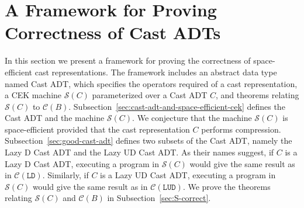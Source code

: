 \documentclass[runningheads]{llncs}
\newcommand{\CMachine}[1]{\ensuremath{\mathcal{C}(#1)}}
\newcommand{\LDMachine}{\CMachine{\BLD}}
\newcommand{\LUDMachine}{\CMachine{\BLUD}}
\newcommand{\SMachine}[1]{\ensuremath{\mathcal{S}(#1)}}
\newcommand{\BLD}[0]{\ensuremath{\mathtt{LD}}}
\newcommand{\BLUD}[0]{\ensuremath{\mathtt{LUD}}}
\begin{document}
\section{A Framework for Proving Correctness of Cast ADTs}
\label{sec:framework}

In this section we present a framework for proving the correctness of
space-efficient cast representations.  The framework includes an
abstract data type named Cast ADT, which specifies the operators
required of a cast representation, a CEK machine $\SMachine{C}$
parameterized over a Cast ADT $C$, and theorems relating
$\SMachine{C}$ to $\CMachine{B}$.
%
Subsection~\ref{sec:cast-adt-and-space-efficient-cek} defines the Cast
ADT and the machine \SMachine{C}. We conjecture that the machine
\SMachine{C} is space-efficient provided that the cast representation
$C$ performs compression.
%
Subsection~\ref{sec:good-cast-adt} defines two subsets of the Cast
ADT, namely the Lazy D Cast ADT and the Lazy UD Cast ADT. As their
names suggest, if $C$ is a Lazy D Cast ADT, executing a program in
$\SMachine{C}$ would give the same result as in
$\LDMachine$. Similarly, if $C$ is a Lazy UD Cast ADT, executing a
program in $\SMachine{C}$ would give the same result as in
$\LUDMachine$.
%
We prove the theorems relating \SMachine{C} and \CMachine{B} in
Subsection~\ref{sec:S-correct}.
\end{document}

